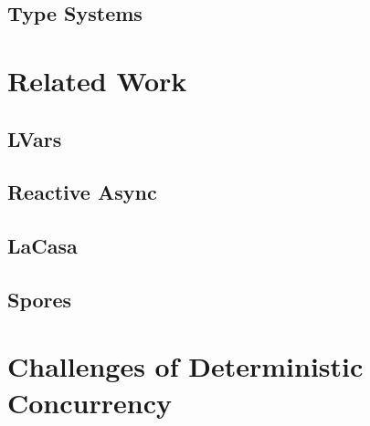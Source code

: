 \documentclass{kththesis}
\begin{document}

\section{Type Systems}
\label{sec:type_systems}



\chapter{Related Work}
\label{cha:related_work}

\section{LVars}
\label{sec:lvars}


\section{Reactive Async}
\label{sec:reactive_async}


\section{LaCasa}
\label{sec:lacasa}


\section{Spores}
\label{sec:spores}




\chapter{Challenges of Deterministic Concurrency}
\label{cha:challenges}
\end{document}
